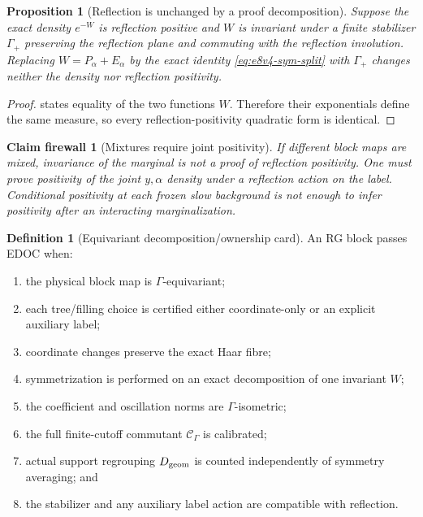 \documentclass[11pt,oneside]{book}
\newtheorem{proposition}[theorem]{Proposition}
\newtheorem{firewall}[theorem]{Claim firewall}
\theoremstyle{definition}
\newtheorem{definition}[theorem]{Definition}
\theoremstyle{remark}
\begin{document}
\begin{proposition}[Reflection is unchanged by a proof decomposition]
\label{prop:e8v4-reflection}
Suppose the exact density \(e^{-W}\) is reflection positive and
\(W\) is invariant under a finite stabilizer
\(\Gamma_+\) preserving the reflection plane and commuting with the
reflection involution.  Replacing
\(W=P_\alpha+E_\alpha\) by the exact identity
\eqref{eq:e8v4-sym-split} with \(\Gamma_+\) changes neither the
density nor reflection positivity.
\end{proposition}

\begin{proof}
 states equality of the two functions
\(W\).  Therefore their exponentials define the same measure, so
every reflection-positivity quadratic form is identical.
\end{proof}

\begin{firewall}[Mixtures require joint positivity]
\label{fire:e8v4-rp-mixture}
If different block maps are mixed, invariance of the marginal is not
a proof of reflection positivity.  One must prove positivity of the
joint \(y,\alpha\) density under a reflection action on the label.
Conditional positivity at each frozen slow background is not enough
to infer positivity after an interacting marginalization.
\end{firewall}

\begin{definition}[Equivariant decomposition/ownership card]
\label{def:e8v4-card}
An RG block passes EDOC when:
\begin{enumerate}[label=\textup{(E\arabic*)},leftmargin=4em]
\item the physical block map is \(\Gamma\)-equivariant;
\item each tree/filling choice is certified either coordinate-only or
      an explicit auxiliary label;
\item coordinate changes preserve the exact Haar fibre;
\item symmetrization is performed on an exact decomposition of one
      invariant \(W\);
\item the coefficient and oscillation norms are \(\Gamma\)-isometric;
\item the full finite-cutoff commutant
      \({\mathcal C}_\Gamma\) is calibrated;
\item actual support regrouping \(D_{\rm geom}\) is counted
      independently of symmetry averaging; and
\item the stabilizer and any auxiliary label action are compatible
      with reflection.
\end{enumerate}
\end{definition}
\end{document}
